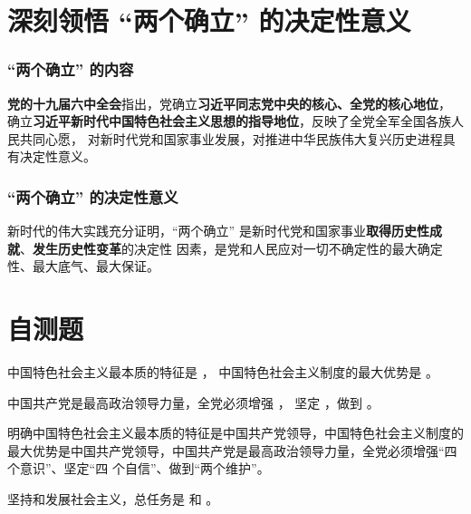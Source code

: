 \documentclass[UTF8,10pt]{ctexbook} %
\begin{document}
\section{深刻领悟 “两个确立” 的决定性意义}
\setcounter{subsubsection}{0}

\subsubsection{“两个确立” 的内容}

\textbf{党的十九届六中全会}指出，党确立\textbf{习近平同志党中央的核心、全党的核心地位}，
确立\textbf{习近平新时代中国特色社会主义思想的指导地位}，反映了全党全军全国各族人民共同心愿，
对新时代党和国家事业发展，对推进中华民族伟大复兴历史进程具有决定性意义。

\subsubsection{“两个确立” 的决定性意义}

新时代的伟大实践充分证明，“两个确立” 是新时代党和国家事业\textbf{取得历史性成就}、\textbf{发生历史性变革}的决定性
因素，是党和人民应对一切不确定性的最大确定性、最大底气、最大保证。

\newpage
\section*{自测题}
\setcounter{example}{0}

\begin{example}
    中国特色社会主义最本质的特征是 \underline{\qquad \qquad}，
    中国特色社会主义制度的最大优势是 \underline{\qquad \qquad}。
\end{example}

\begin{example}
    中国共产党是最高政治领导力量，全党必须增强 \underline{\qquad \qquad \qquad}，
    坚定 \underline{\qquad \qquad \qquad}，做到 \underline{\qquad \qquad \qquad}。
\end{example}

\begin{remark}
    明确中国特色社会主义最本质的特征是中国共产党领导，中国特色社会主义制度的最大优势是中国共产党领导，中国共产党是最高政治领导力量，全党必须增强“四个意识”、坚定“四 个自信”、做到“两个维护”。
\end{remark}

\begin{example}
    坚持和发展社会主义，总任务是 \underline{\qquad \qquad \qquad}
    和 \underline{\qquad \qquad \qquad}。
\end{example}
\end{document}
